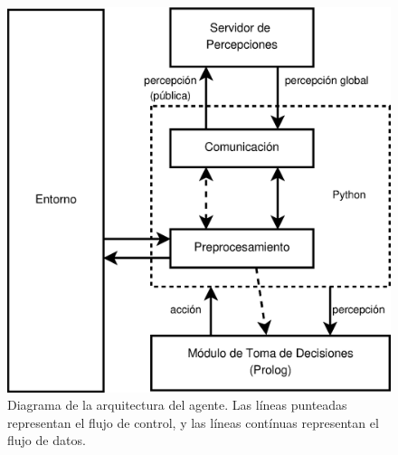  \begin{figure}
 \centering
 \includegraphics[scale=.4]{graficos/eps/agent_architecture.eps}
 \caption{Diagrama de la arquitectura del agente. Las líneas punteadas
 representan el flujo de control, y las líneas contínuas representan el
 flujo de datos.}
 \label{fig:architecture}
 \end{figure}
 
  
 
